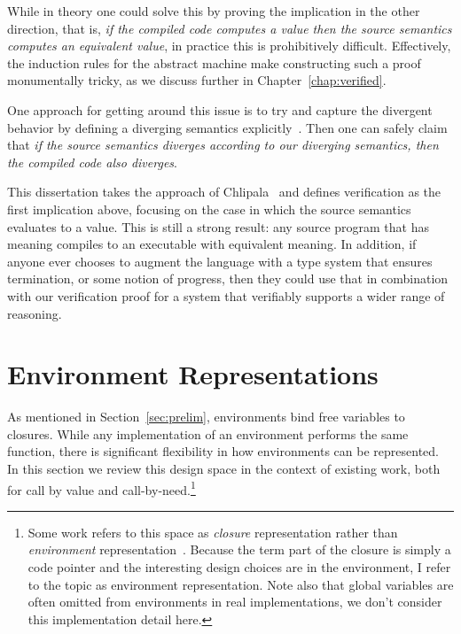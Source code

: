 While in theory one could solve this by proving the implication in the other
direction, that is, \emph{if the compiled code computes a value then the source
semantics computes an equivalent value}, in practice this is prohibitively
difficult. Effectively, the induction rules for the abstract machine make
constructing such a proof monumentally tricky, as we discuss further in
Chapter~\ref{chap:verified}.

One approach for getting around this issue is to try and capture the divergent
behavior by defining a diverging semantics explicitly~\cite{functionalbigstep}.
Then one can safely claim that \emph{if the source semantics diverges according to
our diverging semantics, then the compiled code also diverges}. 

This dissertation takes the approach of Chlipala~\cite{chlipala2007certified}
and defines verification as the first implication above, focusing on the case in
which the source semantics evaluates to a value. This is still a strong
result: any source program that has meaning compiles to an executable with
equivalent meaning. In addition, if anyone ever chooses to augment the language
with a type system that ensures termination, or some notion of progress, then
they could use that in combination with our verification proof for a system that
verifiably supports a wider range of reasoning.

\section{Environment Representations} \label{sec:env}

As mentioned in Section~\ref{sec:prelim}, environments bind free variables to
closures. While any implementation of an environment performs the same function,
there is significant flexibility in how environments can be represented. In this
section we review this design space in the context of existing work, both for
call by value and call-by-need.\footnote{Some work refers to this space as
\emph{closure} representation rather than \emph{environment}
representation~\cite{shao1994space,appel1988optimizing}.  Because the term part
of the closure is simply a code pointer and the interesting design choices are
in the environment, I refer to the topic as environment representation. Note
also that global variables are often omitted from environments in real
implementations, we don't consider this implementation detail here.}

